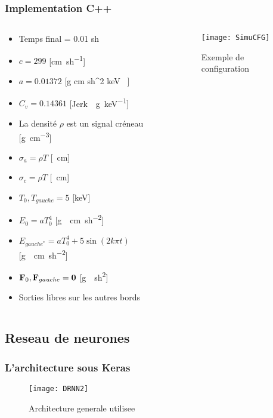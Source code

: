 \begin{frame}
  \frametitle{Implementation C++}
  \begin{columns}
    \begin{column}{0.6\textwidth}
      \scriptsize
      \begin{itemize}
        \item Temps final = 0.01 \si{sh} %
        \item $c = 299$ [\si{\cm \per sh}]
        \item $a = 0.01372$ [\si{g \per cm \per sh^2  \per keV }]
        \item $C_v = 0.14361$ [\si{Jerk \per\g \per keV}] %
        \item La densité $\rho$ est un signal créneau [\si{\g\per\cm\cubed}]
        \item $\sigma_a = \rho T$ [\si{\per\cm}]
        \item $\sigma_c = \rho T$ [\si{\per\cm}]
        \item $T_0, T_{gauche} = 5$ [\si{keV}] %
        \item $E_0 = aT_0^4$ [\si{g \per \cm \per sh^2}]
        \item $E_{gauche^*} = aT_{0}^4 + 5 \sin (2 k \pi t)$ [\si{g \per \cm \per sh^2}]
        \item $\mathbf{F}_0, \mathbf{F}_{gauche} = \mathbf{0}$ [\si{g \per sh^2}]
        \item Sorties libres sur les autres bords
      \end{itemize}
    \end{column}
    \begin{column}{0.4\textwidth}
       \begin{figure}
        \texttt{[image: SimuCFG]}   %
        \caption{Exemple de configuration}
      \end{figure}
    \end{column}
   \end{columns}
\end{frame}

\subsection{Reseau de neurones}

\begin{frame}
    \frametitle{L'architecture sous Keras}
    \begin{center}
        \begin{figure}
        \texttt{[image: DRNN2]}    %
        \caption{Architecture generale utilisee}
        \end{figure}
    \end{center}
\end{frame}

